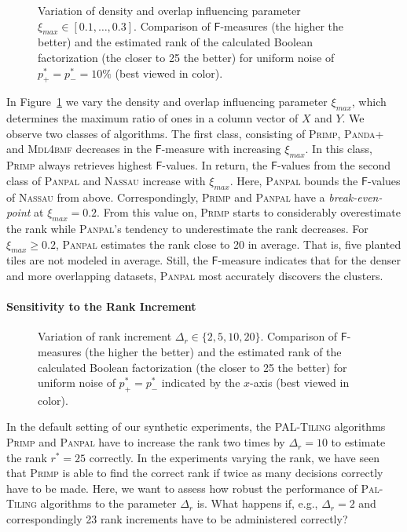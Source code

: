 \begin{figure}
\centering

\caption{Variation of density and overlap influencing parameter $\xi_{max}\in[0.1,\ldots,0.3]$. Comparison of $\mathsf{F}$-measures (the higher the better) and the estimated rank of the calculated Boolean factorization (the closer to 25 the better) for uniform noise of $p_+^*=p_-^*=10\%$ (best viewed in color).}
\label{fig:density}
\end{figure}
In Figure~\ref{fig:density} we vary the density and overlap influencing parameter $\xi_{max}$, which determines the maximum ratio of ones in a column vector of $X$ and  $Y$.  We observe two classes of algorithms. The first class, consisting of \textsc{Primp}, \textsc{Panda+} and \textsc{Mdl4bmf} decreases in the $\mathsf{F}$-measure with increasing $\xi_{max}$. In this class, \textsc{Primp} always retrieves highest $\mathsf{F}$-values. In return, the $\mathsf{F}$-values from the second class of \textsc{Panpal} and \textsc{Nassau} increase with $\xi_{max}$. Here, \textsc{Panpal} bounds the $\mathsf{F}$-values of \textsc{Nassau} from above. Correspondingly, \textsc{Primp} and \textsc{Panpal} have a \textit{break-even-point} at $\xi_{max}=0.2$. From this value on, \textsc{Primp} starts to considerably overestimate the rank while \textsc{Panpal}'s tendency to underestimate the rank decreases. For $\xi_{max}\geq0.2$, \textsc{Panpal} estimates the rank close to 20 in average. That is, five planted tiles are not modeled in average. Still, the $\mathsf{F}$-measure indicates that for the denser and more overlapping datasets, \textsc{Panpal} most accurately discovers the clusters. 
\paragraph{Sensitivity to the Rank Increment}
\begin{figure}
\centering

\caption{Variation of rank increment $\Delta_r\in\{2,5,10,20\}$. Comparison of $\mathsf{F}$-measures (the higher the better) and the estimated rank of the calculated Boolean factorization (the closer to 25 the better) for uniform noise of $p_+^*=p_-^*$ indicated by the $x$-axis (best viewed in color).}
\label{fig:rInc}
\end{figure}
In the default setting of our synthetic experiments, the \textsc{PAL-Tiling} algorithms \textsc{Primp} and \textsc{Panpal} have to increase the rank two times by $\Delta_r=10$ to estimate the rank $r^*=25$ correctly. In the experiments varying the rank, we have seen that \textsc{Primp} is able to find the correct rank if twice as many decisions correctly have to be made.  Here, we want to assess how robust the performance of \textsc{Pal-Tiling} algorithms to the parameter $\Delta_r$ is. What happens if, e.g., $\Delta_r=2$ and correspondingly 23 rank increments have to be administered correctly?

